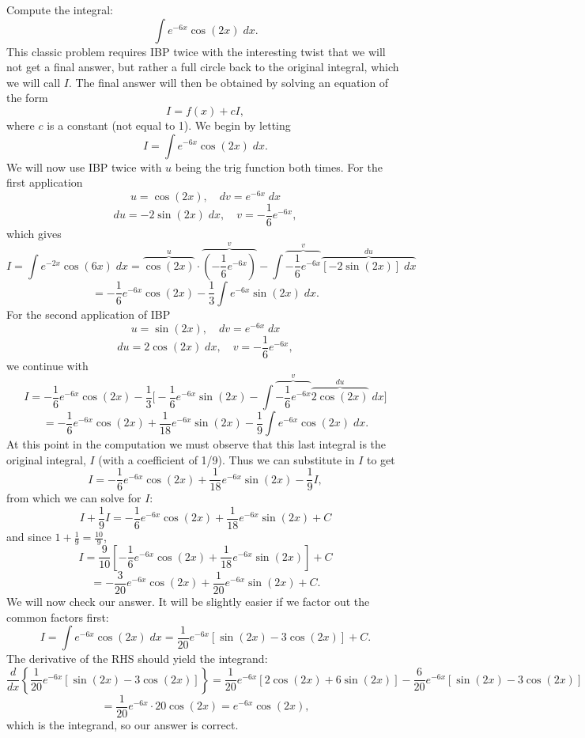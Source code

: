 \documentclass{ximera}
\begin{document}
\begin{example}
Compute the integral:
\[
\int e^{-6x}\cos(2x) \; dx.
\]
This classic problem requires IBP twice with the interesting twist that we will not get a final answer, but rather 
a full circle back to the original integral, which we will call $I$.  The final answer will then be obtained by solving an equation 
of the form
\[
I = f(x) + cI,
\]
where $c$ is a constant (not equal to 1).
We begin by letting 
\[
I = \int e^{-6x}\cos(2x) \; dx.
\]
We will now use IBP twice with $u$ being the trig function both times.
For the first application
\[
u = \cos(2x), \quad dv = e^{-6x} \; dx
\]
\[
du = -2\sin(2x) \; dx,  \quad v = -\frac16 e^{-6x},
\]
which gives
\[
I = \int e^{-2x}\cos(6x) \; dx = \overbrace{\cos(2x)}^{u} \cdot 
\overbrace{\left(-\frac16 e^{-6x}\right)}^{v} - \int \overbrace{-\frac16 e^{-6x}}^{v} \overbrace{[-2\sin(2x)] \; dx}^{du}
\]
\[
= -\frac16 e^{-6x}\cos(2x) - \frac13\int  e^{-6x}\sin(2x) \; dx.
\]
For the second application of IBP
\[
u = \sin(2x), \quad dv = e^{-6x} \; dx
\]
\[
du = 2\cos(2x) \; dx,  \quad v = -\frac16 e^{-6x},
\]
we continue with
\[
I = -\frac16 e^{-6x}\cos(2x) - \frac13\Big[ -\frac16 e^{-6x}\sin(2x) - \int  \overbrace{-\frac16 e^{-6x}}^{v} \overbrace{ 2\cos(2x)}^{du} \; dx    \Big]
\]
\[
= -\frac16 e^{-6x}\cos(2x) + \frac{1}{18} e^{-6x}\sin(2x) - \frac19 \int e^{-6x} \cos(2x) \; dx. 
\]
At this point in the computation we must observe that this last integral is the original integral, $I$ (with a coefficient of 1/9). 
Thus we can substitute in $I$ to get
\[
I = -\frac16 e^{-6x}\cos(2x) + \frac{1}{18} e^{-6x}\sin(2x) - \frac19 I,
\]
from which we can solve for $I$:
\[
I + \frac19 I = -\frac16 e^{-6x}\cos(2x) + \frac{1}{18} e^{-6x}\sin(2x) + C
\]
and since $1+\frac19 = \frac{10}{9}$, 
\[
I = \frac{9}{10} \left[-\frac16 e^{-6x}\cos(2x) + \frac{1}{18} e^{-6x}\sin(2x)\right] + C
\]
\[
= -\frac{3}{20} e^{-6x}\cos(2x) + \frac{1}{20} e^{-6x}\sin(2x) + C.
\]
We will now check our answer. It will be slightly easier if we factor out the common factors first:
\[
I = \int e^{-6x}\cos(2x) \; dx = \frac{1}{20} e^{-6x} \left[\sin(2x) - 3\cos(2x)\right] + C.
\]
The derivative of the RHS should yield the integrand:
\[
\frac{d}{dx}\left\{\frac{1}{20} e^{-6x} \left[\sin(2x) - 3\cos(2x)\right]\right\}    = \frac{1}{20} e^{-6x}\left[2\cos(2x) + 6\sin(2x)\right] 
- \frac{6}{20} e^{-6x} \left[\sin(2x) - 3\cos(2x)\right] 
\]
\[
= \frac{1}{20} e^{-6x} \cdot 20\cos(2x) = e^{-6x} \cos(2x),
\]
which is the integrand, so our answer is correct.
\end{example}
\end{document}
